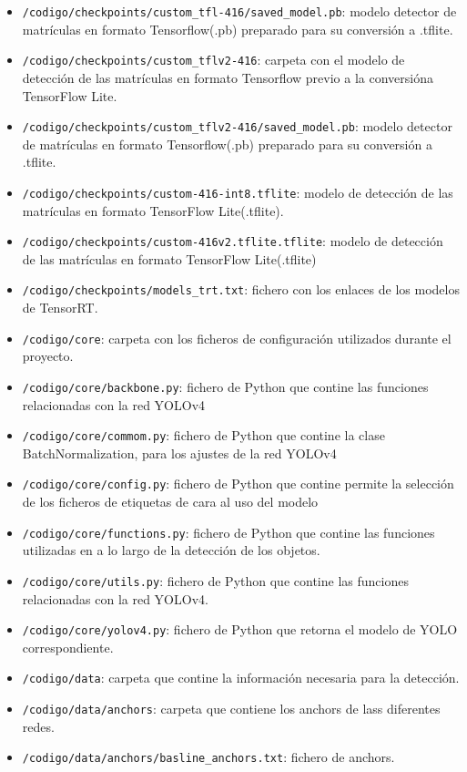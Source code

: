 \begin{itemize}
    \item \texttt{/codigo/checkpoints/custom\_tfl-416/saved\_model.pb}: modelo detector de matrículas en formato Tensorflow(.pb) preparado para su conversión a .tflite.
    \item \texttt{/codigo/checkpoints/custom\_tflv2-416}: carpeta con el modelo de detección de las matrículas en formato Tensorflow previo a la conversióna TensorFlow Lite.
    \item \texttt{/codigo/checkpoints/custom\_tflv2-416/saved\_model.pb}: modelo detector de matrículas en formato Tensorflow(.pb) preparado para su conversión a .tflite.
    \item \texttt{/codigo/checkpoints/custom-416-int8.tflite}: modelo de detección de las matrículas en formato TensorFlow Lite(.tflite).
    \item \texttt{/codigo/checkpoints/custom-416v2.tflite.tflite}: modelo de detección de las matrículas en formato TensorFlow Lite(.tflite)
    \item \texttt{/codigo/checkpoints/models\_trt.txt}: fichero con los enlaces de los modelos de TensorRT.
    \item \texttt{/codigo/core}: carpeta con los ficheros de configuración utilizados durante el proyecto.
    \item \texttt{/codigo/core/backbone.py}: fichero de Python que contine las funciones relacionadas con la red YOLOv4
    \item \texttt{/codigo/core/commom.py}: fichero de Python que contine la clase BatchNormalization, para los ajustes de la red YOLOv4
    \item \texttt{/codigo/core/config.py}: fichero de Python que contine permite la selección de los ficheros de etiquetas de cara al uso del modelo
    \item \texttt{/codigo/core/functions.py}: fichero de Python que contine las funciones utilizadas en a lo largo de la detección de los objetos.
    \item \texttt{/codigo/core/utils.py}: fichero de Python que contine las funciones relacionadas con la red YOLOv4.
    \item \texttt{/codigo/core/yolov4.py}: fichero de Python que retorna el modelo de YOLO correspondiente.
    \item \texttt{/codigo/data}: carpeta que contine la información necesaria para la detección.
    \item \texttt{/codigo/data/anchors}: carpeta que contiene los anchors de lass diferentes redes.
    \item \texttt{/codigo/data/anchors/basline\_anchors.txt}: fichero de anchors.

\end{itemize}
